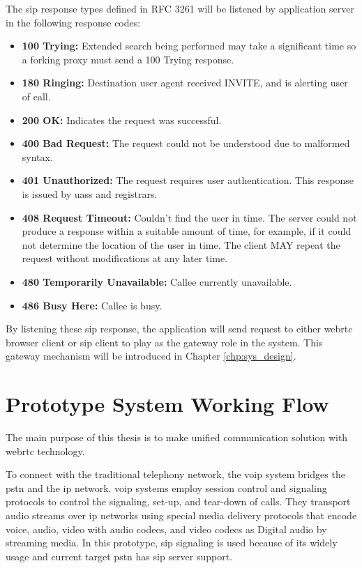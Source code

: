 \noindent The \gls{sip} response types defined in RFC 3261 will be listened by application server in the following response codes\cite{wiki:sip_response_codes}:

\begin{itemize}[topsep=-1em,parsep=0em,itemsep=0em]
 \item \textbf{100 Trying:} Extended search being performed may take a significant time so a forking proxy must send a 100 Trying response.
 \item \textbf{180 Ringing:} Destination user agent received INVITE, and is alerting user of call.
 \item \textbf{200 OK:} Indicates the request was successful.
 \item \textbf{400 Bad Request:} The request could not be understood due to malformed syntax.
 \item \textbf{401 Unauthorized:} The request requires user authentication. This response is issued by \gls{uas}s and registrars.
 \item \textbf{408 Request Timeout:} Couldn't find the user in time. The server could not produce a response within a suitable amount of time, for example, if it could not determine the location of the user in time. The client MAY repeat the request without modifications at any later time.
 \item \textbf{480 Temporarily Unavailable:} Callee currently unavailable.
 \item \textbf{486 Busy Here:} Callee is busy.
\end{itemize}

\par By listening these \gls{sip} response, the application will send request to either \gls{webrtc} browser client or \gls{sip} client to play as the gateway role in the system. This gateway mechanism will be introduced in Chapter \ref{chp:sys_design}.

\section{Prototype System Working Flow}
\noindent The main purpose of this thesis is to make unified communication solution with \gls{webrtc} technology. 
\par To connect with the traditional telephony network, the \gls{voip} system bridges the \gls{pstn} and the \gls{ip} network. \gls{voip} systems employ session control and signaling protocols to control the signaling, set-up, and tear-down of calls. They transport audio streams over \gls{ip} networks using special media delivery protocols that encode voice, audio, video with audio codecs, and video codecs as Digital audio by streaming media. In this prototype, \gls{sip} signaling is used because of its widely usage and current target \gls{pstn} has \gls{sip} server support.

